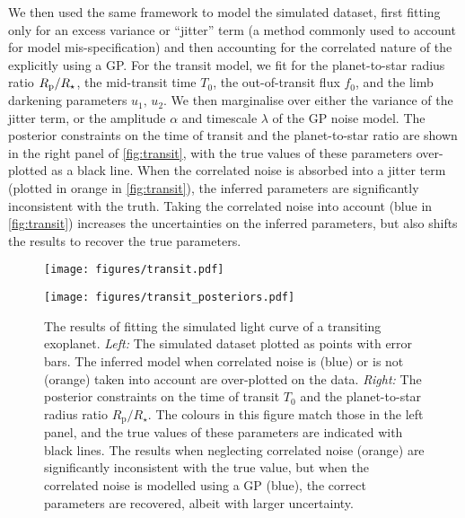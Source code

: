 \documentclass[letterpaper]{ar-1col}
\newcommand{\amplitude}{\ensuremath{\alpha}}
\newcommand{\lengthscale}{\ensuremath{\lambda}}
\begin{document}
We then used the same framework to model the simulated dataset, first fitting only for an excess variance or ``jitter'' term (a method commonly used to account for model mis-specification) and then accounting for the correlated nature of the explicitly using a GP.
For the transit model, we fit for the planet-to-star radius ratio $R_{\rm p}/R_\star$, the mid-transit time $T_0$, the out-of-transit flux $f_0$, and the limb darkening parameters $u_1,\,u_2$.
We then marginalise over either the variance of the jitter term, or the amplitude $\amplitude$ and timescale $\lengthscale$ of the GP noise model.
The posterior constraints on the time of transit and the planet-to-star ratio are shown in the right panel of \autoref{fig:transit}, with the true values of these parameters over-plotted as a black line.
When the correlated noise is absorbed into a jitter term (plotted in orange in \autoref{fig:transit}), the inferred parameters are significantly inconsistent with the truth.
Taking the correlated noise into account (blue in \autoref{fig:transit}) increases the uncertainties on the inferred parameters, but also shifts the results to recover the true parameters.


\begin{figure}[ht]
  \centering
  \begin{minipage}[t]{0.5\linewidth}
    \texttt{[image: figures/transit.pdf]}
  \end{minipage} \hfill
  \begin{minipage}[t]{0.44\linewidth}
    \texttt{[image: figures/transit\_posteriors.pdf]}
  \end{minipage}
  \caption{The results of fitting the simulated light curve of a transiting exoplanet.
  \emph{Left:} The simulated dataset plotted as points with error bars.
  The inferred model when correlated noise is (blue) or is not (orange) taken into account are over-plotted on the data.
  \emph{Right:} The posterior constraints on the time of transit $T_0$ and the planet-to-star radius ratio $R_\mathrm{p}/R_\star$.
  The colours in this figure match those in the left panel, and the true values of these parameters are indicated with black lines.
  The results when neglecting correlated noise (orange) are significantly inconsistent with the true value, but when the correlated noise is modelled using a GP (blue), the correct parameters are recovered, albeit with larger uncertainty.}
  \label{fig:transit}
\end{figure}
\end{document}
